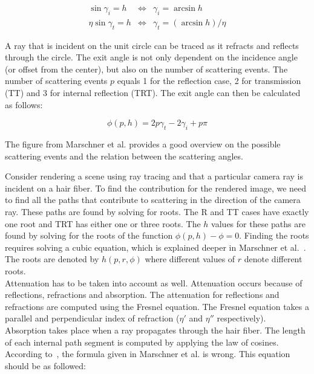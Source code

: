 \documentclass[11pt,a4paper]{report}
\begin{document}
\begin{eqnarray*}
\sin \gamma_i = h & \Leftrightarrow & \gamma_i = \arcsin h \\
\eta \sin \gamma_t = h & \Leftrightarrow & \gamma_t = (\arcsin h) / \eta
\end{eqnarray*}

A ray that is incident on the unit circle can be traced as it refracts and reflects through the circle. The exit angle is not only dependent on the incidence angle (or offset from the center), but also on the number of scattering events. The number of scattering events $p$ equals 1 for the reflection case, 2 for transmission (TT) and 3 for internal reflection (TRT). The exit angle can then be calculated as follows:

\begin{equation}
\label{eq_relative_azimuth_change}
\phi(p,h) = 2p \gamma_t - 2 \gamma_i + p \pi
\end{equation}

The figure from Marschner et al. provides a good overview on the possible scattering events and the relation between the scattering angles.

Consider rendering a scene using ray tracing and that a particular camera ray is incident on a hair fiber. To find the contribution for the rendered image, we need to find all the paths that contribute to scattering in the direction of the camera ray. These paths are found by solving for roots. The R and TT cases have exactly one root and TRT has either one or three roots. The $h$ values for these paths are found by solving for the roots of the function $\phi(p, h) - \phi = 0$. Finding the roots requires solving a cubic equation, which is explained deeper in Marschner et al.~\cite{marschner}. The roots are denoted by $h(p, r, \phi)$ where different values of $r$ denote different roots. \\


Attenuation has to be taken into account as well. Attenuation occurs because of reflections, refractions and absorption. The attenuation for reflections and refractions are computed using the Fresnel equation. The Fresnel equation takes a parallel and perpendicular index of refraction ($\eta'$ and $\eta''$ respectively). Absorption takes place when a ray propagates through the hair fiber. The length of each internal path segment is computed by applying the law of cosines. According to~\cite{}, the formula given in Marschner et al. is wrong. This equation should be as followed:
\end{document}
